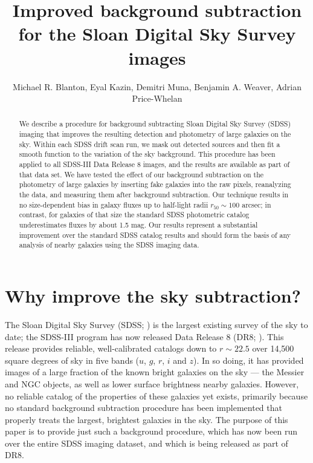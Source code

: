 \documentclass[10pt,preprint]{aastex}
\newcounter{address}
\begin{document}
\title{Improved background subtraction for the Sloan Digital Sky
  Survey images}


\author{
Michael R. Blanton\altaffilmark{\ref{NYU}},
Eyal Kazin\altaffilmark{\ref{NYU}},
Demitri Muna\altaffilmark{\ref{NYU}},
Benjamin A. Weaver\altaffilmark{\ref{NYU}},
Adrian Price-Whelan\altaffilmark{\ref{NYU}} 
}

\setcounter{address}{1}

\begin{abstract}
We describe a procedure for background subtracting Sloan Digital Sky
Survey (SDSS) imaging that improves the resulting detection and
photometry of large galaxies on the sky.  Within each SDSS drift scan
run, we mask out detected sources and then fit a smooth function to
the variation of the sky background.  This procedure has been applied
to all SDSS-III Data Release 8 images, and the results are available
as part of that data set.  We have tested the effect of our background
subtraction on the photometry of large galaxies by inserting fake
galaxies into the raw pixels, reanalyzing the data, and measuring them
after background subtraction.  Our technique results in no
size-dependent bias in galaxy fluxes up to half-light radii $r_{50}
\sim 100$ arcsec; in contrast, for galaxies of that size the standard
SDSS photometric catalog underestimates fluxes by about 1.5 mag. Our
results represent a substantial improvement over the standard SDSS
catalog results and should form the basis of any analysis of nearby
galaxies using the SDSS imaging data.
\end{abstract}

\section{Why improve the sky subtraction?}
\label{sec:intro}

The Sloan Digital Sky Survey (SDSS; \citealt{york00a}) is the largest
existing survey of the sky to date; the SDSS-III program has now
released Data Release 8 (DR8; \citealt{eisenstein11a, aihara11a}).
This release provides reliable, well-calibrated catalogs down to
$r\sim 22.5$ over 14,500 square degrees of sky in five bands ($u$,
$g$, $r$, $i$ and $z$).  In so doing, it has provided images of a
large fraction of the known bright galaxies on the sky --- the Messier
and NGC objects, as well as lower surface brightness nearby
galaxies. However, no reliable catalog of the properties of these
galaxies yet exists, primarily because no standard background
subtraction procedure has been implemented that properly treats the
largest, brightest galaxies in the sky. The purpose of this paper is
to provide just such a background procedure, which has now been run
over the entire SDSS imaging dataset, and which is being released as
part of DR8.
\end{document}
